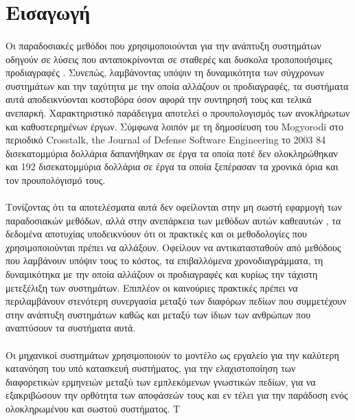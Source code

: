 \documentclass[a4paper,12pt,twoside]{report}
\begin{document}
{%
		\section{Εισαγωγή}
			\paragraph{} {Οι παραδοσιακές μεθόδοι που χρησιμοποιούνται για την ανάπτυξη συστημάτων οδηγούν σε λύσεις που ανταποκρίνονται σε σταθερές και δυσκολα τροποποιήσιμες προδιαγραφές . Συνεπώς, λαμβάνοντας υπόψιν τη δυναμικότητα των σύγχρονων συστημάτων και την ταχύτητα με την οποία αλλάζουν οι προδιαγραφές, τα συστήματα αυτά αποδεικνύονται κοστοβόρα όσον αφορά την συντηρησή τους και τελικά ανεπαρκή. Χαρακτηριστικό παράδειγμα αποτελεί ο προυπολογισμός των ανοκλήρωτων και καθυστερημένων έργων. Σύμφωνα λοιπόν με τη δημοσίευση του Mogyorodi στο περιοδικό Crosstalk, the Journal of Defense Software Engineering το 2003 \cite{JournalDefenseMogyorodi} 84 δισεκατομμύρια δολλάρια δαπανήθηκαν σε έργα τα οποία ποτέ δεν ολοκληρώθηκαν και 192 δισεκατομμύρια δολλάρια σε έργα τα οποία ξεπέρασαν τα χρονικά όρια και τον προυπολόγισμό τους.
			}
			\paragraph{} {Τονίζοντας ότι τα αποτελέσματα αυτά δεν οφείλονται στην μη σωστή εφαρμογή των παραδοσιακών μεθόδων, αλλά στην ανεπάρκεια των μεθόδων αυτών καθεαυτών \cite{MDSysDevelIBM}, τα δεδομένα αποτυχίας υποδεικνύουν ότι οι πρακτικές και οι μεθοδολογίες που χρησιμοποιούνται πρέπει να αλλάξουν. Οφείλουν να αντικατασταθούν από μεθόδους που λαμβάνουν υπόψιν τους το κόστος, τα επιβαλλόμενα χρονοδιαγράμματα, τη δυναμικότηκα με την οποία αλλάζουν οι προδιαγραφές και κυρίως την τάχιστη μετεξέλιξη των συστημάτων. Επιπλέον οι καινούριες πρακτικές πρέπει να περιλαμβάνουν στενότερη συνεργασία μεταξύ των διαφόρων πεδίων που συμμετέχουν στην ανάπτυξη συστημάτων καθώς και μεταξύ των ίδιων των ανθρώπων που αναπτύσουν τα συστήματα αυτά. 
			}
			
			\paragraph{} {Οι μηχανικοί συστημάτων χρησιμοποιούν το μοντέλο ως εργαλείο για την καλύτερη κατανόηση του υπό κατασκευή συστήματος, για την ελαχιστοποίηση των διαφορετικών ερμηνειών μεταξύ των εμπλεκόμενων γνωστικών πεδίων, για να εξακριβώσουν την ορθότητα των αποφάσεών τους και εν τέλει για την παράδοση ενός ολοκληρωμένου και σωστού συστήματος. Τ
			}
			
}
\end{document}
